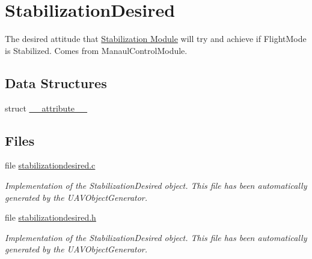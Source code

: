 \hypertarget{group___stabilization_desired}{\section{\-Stabilization\-Desired}
\label{group___stabilization_desired}
}


\-The desired attitude that \hyperlink{group___stabilization_module}{\-Stabilization \-Module} will try and achieve if \-Flight\-Mode is \-Stabilized. \-Comes from \-Manaul\-Control\-Module.  


\subsection*{\-Data \-Structures}
\begin{DoxyCompactItemize}
\item 
struct \hyperlink{struct____attribute____}{\-\_\-\-\_\-attribute\-\_\-\-\_\-}
\end{DoxyCompactItemize}
\subsection*{\-Files}
\begin{DoxyCompactItemize}
\item 
file \hyperlink{stabilizationdesired_8c}{stabilizationdesired.\-c}
\begin{DoxyCompactList}\small\item\em \-Implementation of the \-Stabilization\-Desired object. \-This file has been automatically generated by the \-U\-A\-V\-Object\-Generator. \end{DoxyCompactList}\item 
file \hyperlink{stabilizationdesired_8h}{stabilizationdesired.\-h}
\begin{DoxyCompactList}\small\item\em \-Implementation of the \-Stabilization\-Desired object. \-This file has been automatically generated by the \-U\-A\-V\-Object\-Generator. \end{DoxyCompactList}\end{DoxyCompactItemize}
